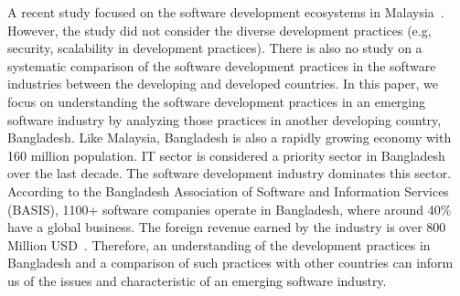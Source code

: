 A recent study 
focused on the software development ecosystems in Malaysia~\citep{Baharom2006}. However, the study 
did not consider the diverse development practices (e.g, security, scalability in development practices). There 
is also no study on a systematic comparison of the software development practices in the software industries 
between the developing and developed countries. In this paper, we focus on understanding the software development 
practices in an emerging software industry 
by analyzing those practices in another developing country, Bangladesh. Like Malaysia, 
Bangladesh is also a rapidly growing economy with 160 million
population. IT sector is considered a priority sector in Bangladesh over the
last decade. The software development industry dominates this sector. According to the
Bangladesh Association of Software and Information Services (BASIS), 1100+
software companies operate in Bangladesh, where around 40\% have a global
business. The foreign revenue earned by the industry is over 800 Million
USD~\citep{BASIS2018}. Therefore, an understanding of the development practices in Bangladesh and a comparison of such practices 
with other countries can inform us of the issues and characteristic of an emerging software industry.
 
 
